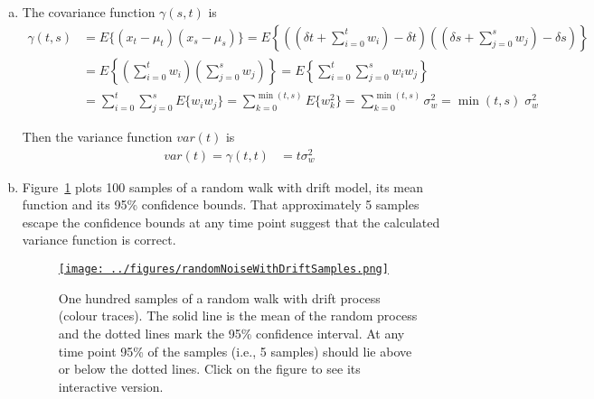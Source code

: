 \documentclass[12pt]{article}
\begin{document}
\begin{enumerate}
\begin{enumerate}[(a)]
            \item The covariance function $\gamma(s, t)$ is
                \begin{align*}
                    \gamma(t,s)&=E\{(x_t-\mu_t)(x_s-\mu_s)\}=E\left\{
                        \left(\left(\delta t+\sum_{i=0}^tw_i\right)-\delta t\right)
                        \left(\left(\delta s+\sum_{j=0}^sw_j\right)-\delta s\right)
                    \right\}\\
                    &=E\left\{
                        \left(\sum_{i=0}^tw_i\right)
                        \left(\sum_{j=0}^sw_j\right)
                    \right\}
                    =E\left\{
                        \sum_{i=0}^t\sum_{j=0}^sw_iw_j
                    \right\}\\
                &=\sum_{i=0}^t\sum_{j=0}^sE\{w_iw_j\}=\sum_{k=0}^{\min(t,s)}E\{w_k^2\}=\sum_{k=0}^{\min(t,s)}\sigma_w^2=\min(t,s)\;\sigma_w^2
                \end{align*}

                Then the variance function $var(t)$ is 
                \begin{align*}
                    var(t)=\gamma(t,t)&=t\sigma_w^2
                \end{align*}

            \item Figure~\ref{fig:randomWalkWithDriftSamples} plots 100 samples
                of a random walk with drift model, its mean function and its
                95\% confidence bounds. That approximately 5 samples escape the
                confidence bounds at any time point suggest that the calculated
                variance function is correct.

                \begin{figure}
                    \begin{center}
                        \href{https://www.gatsby.ucl.ac.uk/~rapela/statNeuro/2025/lectures/01_temporalTimeSeriesAnalysis/figures/randomNoiseWithDriftSamples.html}{\texttt{[image: ../figures/randomNoiseWithDriftSamples.png]}}
                        \caption{One hundred samples of a random walk with
                        drift process (colour traces). The solid line is the
                        mean of the random process and the dotted lines mark
                        the 95\% confidence interval. At any time point 95\% of
                        the samples (i.e., 5 samples) should lie above or below
                        the dotted lines. Click on the figure to see its
                        interactive version.}
                        \label{fig:randomWalkWithDriftSamples}
                    \end{center}
                \end{figure}


\end{enumerate}
\end{enumerate}
\end{document}
